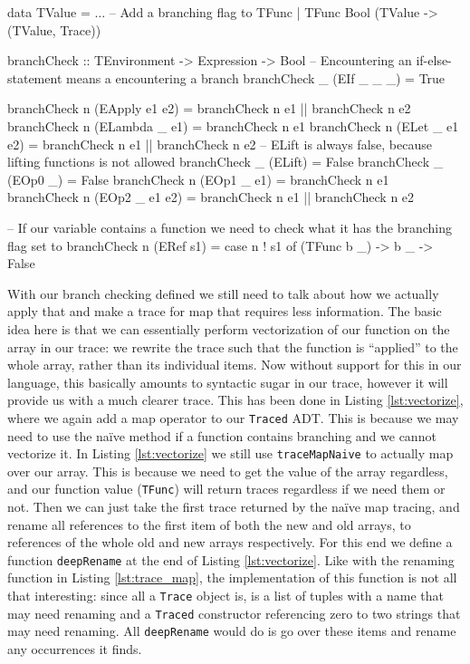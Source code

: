        \begin{haskell}[caption=Checking for branches, label=lst:branching, gobble=12]
            data TValue
                = $\ldots$
                -- Add a branching flag to TFunc
                | TFunc Bool (TValue -> (TValue, Trace))

            branchCheck :: TEnvironment -> Expression -> Bool
            -- Encountering an if-else-statement means a encountering a branch
            branchCheck _ (EIf _ _ _) = True

            branchCheck n (EApply e1 e2) = branchCheck n e1 || branchCheck n e2
            branchCheck n (ELambda _ e1) = branchCheck n e1
            branchCheck n (ELet _ e1 e2) = branchCheck n e1 || branchCheck n e2
            -- ELift is always false, because lifting functions is not allowed
            branchCheck _ (ELift) = False
            branchCheck _ (EOp0 _) = False
            branchCheck n (EOp1 _ e1) = branchCheck n e1
            branchCheck n (EOp2 _ e1 e2) = branchCheck n e1 || branchCheck n e2
            
            -- If our variable contains a function we need to check what it has the branching flag set to
            branchCheck n (ERef s1) = case n ! s1 of
                (TFunc b _) -> b
                _           -> False
        \end{haskell}

        With our branch checking defined we still need to talk about how we actually apply that and make a trace for map that requires less information.
        The basic idea here is that we can essentially perform vectorization of our function on the array in our trace: we rewrite the trace such that the function is ``applied'' to the whole array, rather than its individual items.
        Now without support for this in our language, this basically amounts to syntactic sugar in our trace, however it will provide us with a much clearer trace.
        This has been done in Listing \ref{lst:vectorize}, where we again add a map operator to our \texttt{Traced} ADT.
        This is because we may need to use the naïve method if a function contains branching and we cannot vectorize it.
        In Listing \ref{lst:vectorize} we still use \texttt{traceMapNaive} to actually map over our array.
        This is because we need to get the value of the array regardless, and our function value (\texttt{TFunc}) will return traces regardless if we need them or not.
        Then we can just take the first trace returned by the naïve map tracing, and rename all references to the first item of both the new and old arrays, to references of the whole old and new arrays respectively.
        For this end we define a function \texttt{deepRename} at the end of Listing \ref{lst:vectorize}.
        Like with the renaming function in Listing \ref{lst:trace_map}, the implementation of this function is not all that interesting: since all a \texttt{Trace} object is, is a list of tuples with a name that may need renaming and a \texttt{Traced} constructor referencing zero to two strings that may need renaming.
        All \texttt{deepRename} would do is go over these items and rename any occurrences it finds.

